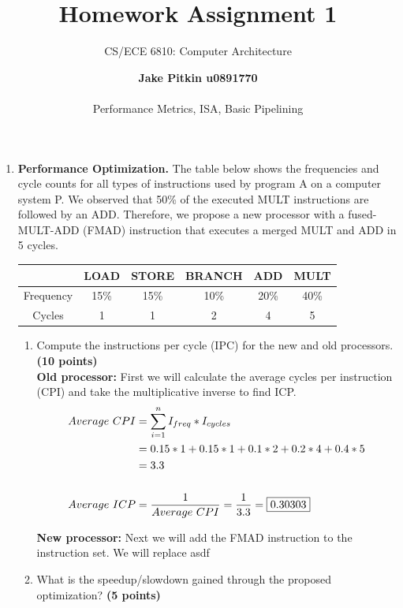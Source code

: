 \documentclass[a4paper, 15pt]{exam}
\title{Homework Assignment 1}
\subtitle{CS/ECE 6810: Computer Architecture}
\author{
\textbf{Jake Pitkin u0891770} \\ \\
Performance Metrics, ISA, Basic Pipelining}
\begin{document}
\maketitle

\begin{enumerate}
	\item \textbf {Performance Optimization.}
   The table below shows the frequencies and cycle counts for all types of instructions used by program A on a computer system P. We observed that 50\% of the executed MULT instructions are followed by an ADD. Therefore, we propose a new processor with a fused-MULT-ADD (FMAD) instruction that executes a merged MULT and ADD in 5 cycles.


   \begin{center}
\begin{tabular}{ |c|c|c|c|c|c| } 
 \hline
  & LOAD & STORE & BRANCH & ADD & MULT \\ 
  \hline
 Frequency & 15\% & 15\% & 10\% & 20\% & 40\% \\ \hline
 Cycles & 1 & 1 & 2 &4 & 5 \\ 

\hline
\end{tabular}
\end{center}
	\begin{enumerate}
    \item Compute the instructions per cycle (IPC) for the new and old processors. \textbf{(10 points)} \\
   
   \textbf{Old processor:} First we will calculate the average cycles per instruction (CPI) and take the multiplicative inverse to find ICP.  
   \begin{align*} 
   			Average \ CPI &= \sum_{i = 1}^n I_{freq} * I_{cycles} \\
   			  			&= 0.15 * 1 + 0.15 * 1 + 0.1 * 2 + 0.2 * 4 + 0.4 * 5 \\
   			  			&= 3.3 \\ \\
   			  			Average \ ICP &= \frac{1}{Average \ CPI} = \frac{1}{3.3} = \fbox{0.30303}
   	\end{align*}
   	
   	\textbf{New processor:} Next we will add the FMAD instruction to the instruction set. We will replace asdf
   	
    \item What is the speedup/slowdown gained through the proposed optimization?  \textbf{(5 points)} \\


\end{enumerate}
\end{enumerate}
\end{document}
